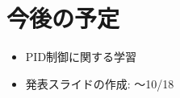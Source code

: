 \documentclass[a4j]{ujarticle}
\begin{document}
\section{今後の予定}
  \begin{itemize}
    \item PID制御に関する学習
    \item 発表スライドの作成: 〜10/18
  \end{itemize}
%
% 
% 
\end{document}
